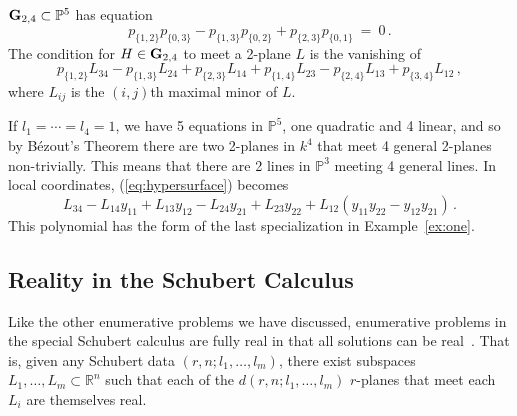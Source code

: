 \begin{example}\label{ex:G22}
${\bf G}_{2,4}\subset{\mathbb P}^5$ has equation
%
\begin{equation}\label{eq:G22}
   p_{\{1,2\}}p_{\{0,3\}}-p_{\{1,3\}}p_{\{0,2\}}+ p_{\{2,3\}}p_{\{0,1\}}
   \ =\ 0\,.
\end{equation}
%
The condition for $H\in{\bf G}_{2,4}$ to meet a 2-plane $L$ is the
vanishing of 
\begin{equation}\label{eq:hypersurface}
    p_{\{1,2\}}L_{34}-p_{\{1,3\}}L_{24}+p_{\{2,3\}}L_{14} 
  + p_{\{1,4\}}L_{23}-p_{\{2,4\}}L_{13}+p_{\{3,4\}}L_{12}\,,
\end{equation}
where $L_{ij}$ is the $(i,j)$th maximal minor of $L$.

If $l_1=\cdots=l_4=1$, we have 5 equations in ${\mathbb P}^5$, one quadratic
and 4 linear, and so by B\'ezout's Theorem there are
two 2-planes in $k^4$ that meet 4 general 2-planes non-trivially. 
This means that there are 2 lines in ${\mathbb P}^3$ meeting 4 general lines. 
In local coordinates, (\ref{eq:hypersurface}) becomes
$$
    L_{34}-L_{14}y_{11}+L_{13}y_{12}-L_{24}y_{21} 
  + L_{23}y_{22} + L_{12}(y_{11}y_{22}-y_{12}y_{21})\,.
$$
This polynomial has the form of the last specialization in
Example~\ref{ex:one}. 
\end{example}


\subsection{Reality in the Schubert Calculus}\label{sec:shapiro}
Like the other enumerative problems we have discussed, enumerative problems
in the special Schubert calculus are fully
real in that all solutions can be 
real~\cite{SO:So99a}. 
That is, given any Schubert data $(r,n;l_1,\ldots,l_m)$, there exist 
subspaces $L_1,\ldots,L_m\subset{\mathbb R}^n$ such that each of the
$d(r,n;l_1,\ldots,l_m)$ $r$-planes that meet each $L_i$ are themselves
real.

